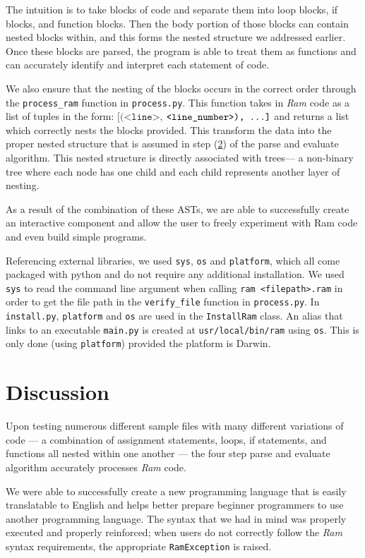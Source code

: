 \documentclass[11pt]{article}
\begin{document}
The intuition is to take blocks of code and separate them into loop blocks, if blocks, and function blocks. Then the body portion of those blocks can contain nested blocks within, and this forms the nested structure we addressed earlier. Once these blocks are parsed, the program is able to treat them as functions and can accurately identify and interpret each statement of code.

We also ensure that the nesting of the blocks occurs in the correct order through the \texttt{process\_ram} function in \texttt{process.py}. This function takes in \emph{Ram} code as a list of tuples in the form: $\texttt{[(<line>,}$ $\texttt{<line\_number>), \dots]}$ and returns a list which correctly nests the blocks provided. This transform the data into the proper nested structure that is assumed in step (\hyperlink{step2}{2}) of the parse and evaluate algorithm. This nested structure is directly associated with trees--- a non-binary tree where each node has one child and each child represents another layer of nesting.

As a result of the combination of these ASTs, we are able to successfully create an interactive component and allow the user to freely experiment with Ram code and even build simple programs.

Referencing external libraries, we used \texttt{sys}, \texttt{os} and \texttt{platform}, which all come packaged with python and do not require any additional installation. We used \texttt{sys} to read the command line argument when calling \texttt{ram <filepath>.ram} in order to get the file path in the \texttt{verify\_file} function in \texttt{process.py}. In \texttt{install.py}, \texttt{platform} and \texttt{os} are used in the \texttt{InstallRam} class. An alias that links to an executable \texttt{main.py} is created at \texttt{usr/local/bin/ram} using \texttt{os}. This is only done (using \texttt{platform}) provided the platform is Darwin.


\section{Discussion}

Upon testing numerous different sample files with many different variations of code --- a combination of assignment statements, loops, if statements, and functions all nested within one another --- the four step parse and evaluate algorithm accurately processes \emph{Ram} code.

We were able to successfully create a new programming language that is easily translatable to English and helps better prepare beginner programmers to use another programming language. The syntax that we had in mind was properly executed and properly reinforced; when users do not correctly follow the \emph{Ram} syntax requirements, the appropriate \texttt{RamException} is raised.
\end{document}
